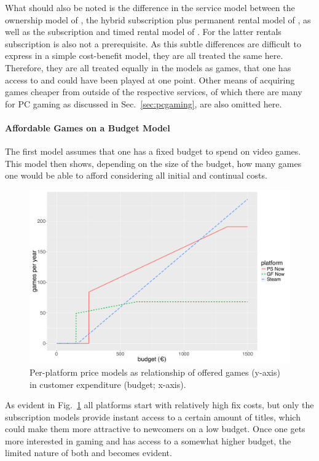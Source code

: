 What should also be noted is the difference in the service model between the ownership model of \steam, the hybrid subscription plus permanent rental model of \gfnow, as well as the subscription and timed rental model of \psnow. For the latter rentals subscription is also not a prerequisite. As this subtle differences are difficult to express in a simple cost-benefit model, they are all treated the same here. Therefore, they are all treated equally in the models as games, that one has access to and could have been played at one point. Other means of acquiring games cheaper from outside of the respective services, of which there are many for PC gaming as discussed in Sec.~\ref{sec:pcgaming}, are also omitted here.

\paragraph{Affordable Games on a Budget Model}

The first model assumes that one has a fixed budget to spend on video games. This model then shows, depending on the size of the budget, how many games one would be able to afford considering all initial and continual costs.

\begin{figure}[!t]
	\centering
	\includegraphics[width=1.0\columnwidth]{images/gamesperyear-over-budget.pdf}
	\caption{Per-platform price models as relationship of offered games (y-axis) in customer expenditure (budget; x-axis).}
\label{fig:gamesperyear-over-budget}
\end{figure}

As evident in Fig.~\ref{fig:gamesperyear-over-budget} all platforms start with relatively high fix costs, but only the subscription models provide instant access to a certain amount of titles, which could make them more attractive to newcomers on a low budget. Once one gets more interested in gaming and has access to a somewhat higher budget, the limited nature of both \psnow and \gfnow becomes evident.


